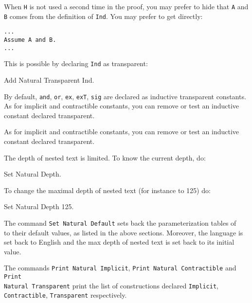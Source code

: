 When \verb=H= is not used a second time in the proof, you may prefer
to hide that \verb=A= and \verb=B= comes from the definition of
\verb=Ind=. You may prefer to get directly:

\begin{verbatim}
...
Assume A and B.
...
\end{verbatim}

This is possible by declaring \verb=Ind= as transparent:

\begin{coq_example*}
Add Natural Transparent Ind.
\end{coq_example*}

By default, \verb=and=, \verb=or=, \verb=ex=, \verb=exT=, \verb=sig=
are declared as inductive transparent constants.  As for implicit and
contractible constants, you can remove or test an inductive
constant declared transparent.

As for implicit and contractible constants, you can remove or test an
inductive constant declared transparent.


The depth of nested text is limited. To know the current depth, do:

\begin{coq_example}
Set Natural Depth.
\end{coq_example}

To change the maximal depth of nested text (for instance to 125) do:

\begin{coq_example}
Set Natural Depth 125.
\end{coq_example}


The command \verb=Set Natural Default= sets back the parameterization tables of
\Natural~ to their default values, as listed in the above sections.
Moreover, the language is set back to English and the max depth of
nested text is set back to its initial value.


The commands {\tt Print Natural Implicit}, {\tt Print Natural
Contractible} and {\tt Print \\ Natural Transparent} print the list of
constructions declared {\tt Implicit}, {\tt Contractible},
{\tt Transparent} respectively.

